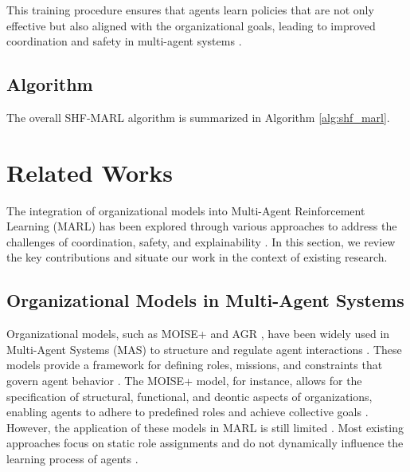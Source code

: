 \documentclass[sigconf,anonymous]{aamas}
\begin{document}
This training procedure ensures that agents learn policies that are not only effective but also aligned with the organizational goals, leading to improved coordination and safety in multi-agent systems \cite{hubner2010moise}.

\subsection{Algorithm}
The overall SHF-MARL algorithm is summarized in Algorithm \ref{alg:shf_marl}.


\section{Related Works}
\label{sec:related_works}

The integration of organizational models into Multi-Agent Reinforcement Learning (MARL) has been explored through various approaches to address the challenges of coordination, safety, and explainability \cite{hernandez2019survey, ghosal2021explainable}. In this section, we review the key contributions and situate our work in the context of existing research.

\subsection{Organizational Models in Multi-Agent Systems}
Organizational models, such as MOISE+ \cite{hubner2010moise} and AGR \cite{agr_reference}, have been widely used in Multi-Agent Systems (MAS) to structure and regulate agent interactions \cite{hubner2007using}. These models provide a framework for defining roles, missions, and constraints that govern agent behavior \cite{hubner2010moise, castaneda2019policy}. The MOISE+ model, for instance, allows for the specification of structural, functional, and deontic aspects of organizations, enabling agents to adhere to predefined roles and achieve collective goals \cite{hubner2010moise}. However, the application of these models in MARL is still limited \cite{hernandez2019survey}. Most existing approaches focus on static role assignments and do not dynamically influence the learning process of agents \cite{foerster2018counterfactual}.
\end{document}
